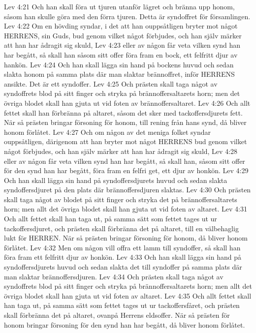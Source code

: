 Lev 4:21  Och han skall föra ut tjuren utanför lägret och bränna upp honom, såsom han skulle göra med den förra tjuren. Detta är syndoffret för församlingen.
Lev 4:22  Om en hövding syndar, i det att han ouppsåtligen bryter mot något HERRENS, sin Guds, bud genom vilket något förbjudes, och han själv märker att han har ådragit sig skuld,
Lev 4:23  eller av någon får veta vilken synd han har begått, så skall han såsom sitt offer föra fram en bock, ett felfritt djur av hankön.
Lev 4:24  Och han skall lägga sin hand på bockens huvud och sedan slakta honom på samma plats där man slaktar brännoffret, inför HERRENS ansikte. Det är ett syndoffer.
Lev 4:25  Och prästen skall taga något av syndoffrets blod på sitt finger och stryka på brännoffersaltarets horn; men det övriga blodet skall han gjuta ut vid foten av brännoffersaltaret.
Lev 4:26  Och allt fettet skall han förbränna på altaret, såsom det sker med tackoffersdjurets fett. När så prästen bringar försoning för honom, till rening från hans synd, då bliver honom förlåtet.
Lev 4:27  Och om någon av det meniga folket syndar ouppsåtligen, därigenom att han bryter mot något HERRENS bud genom vilket något förbjudes, och han själv märker att han har ådragit sig skuld,
Lev 4:28  eller av någon får veta vilken synd han har begått, så skall han, såsom sitt offer för den synd han har begått, föra fram en felfri get, ett djur av honkön.
Lev 4:29  Och han skall lägga sin hand på syndoffersdjurets huvud och sedan slakta syndoffersdjuret på den plats där brännoffersdjuren slaktas.
Lev 4:30  Och prästen skall taga något av blodet på sitt finger och stryka det på brännoffersaltarets horn; men allt det övriga blodet skall han gjuta ut vid foten av altaret.
Lev 4:31  Och allt fettet skall han taga ut, på samma sätt som fettet tages ut ur tackoffersdjuret, och prästen skall förbränna det på altaret, till en välbehaglig lukt för HERREN. När så prästen bringar försoning för honom, då bliver honom förlåtet.
Lev 4:32  Men om någon vill offra ett lamm till syndoffer, så skall han föra fram ett felfritt djur av honkön.
Lev 4:33  Och han skall lägga sin hand på syndoffersdjurets huvud och sedan slakta det till syndoffer på samma plats där man slaktar brännoffersdjuren.
Lev 4:34  Och prästen skall taga något av syndoffrets blod på sitt finger och stryka på brännoffersaltarets horn; men allt det övriga blodet skall han gjuta ut vid foten av altaret.
Lev 4:35  Och allt fettet skall han taga ut, på samma sätt som fettet tages ut ur tackoffersfåret, och prästen skall förbränna det på altaret, ovanpå Herrens eldsoffer. När så prästen för honom bringar försoning för den synd han har begått, då bliver honom förlåtet.
